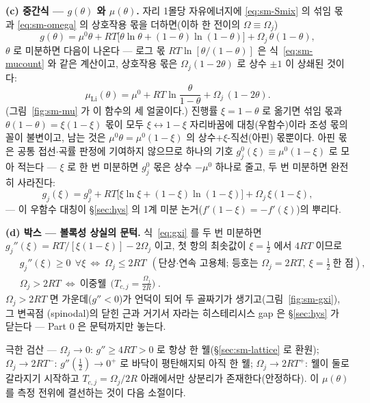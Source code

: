 \textbf{(c) 중간식 --- $g(\theta)$ 와 $\mu(\theta)$.} 자리 1몰당 자유에너지에 \eqref{eq:sm-Smix} 의 섞임 몫과
\eqref{eq:sm-omega} 의 상호작용 몫을 더하면(이하 한 전이의 $\Omega\equiv\Omega_j$)
\begin{equation}
g(\theta)=\mu^0\theta+RT\big[\theta\ln\theta+(1-\theta)\ln(1-\theta)\big]+\Omega_j\,\theta(1-\theta),
\label{eq:sm-gtheta}
\end{equation}
$\theta$ 로 미분하면 다음이 나온다 --- 로그 몫 $RT\ln[\theta/(1-\theta)]$ 은 식~\eqref{eq:sm-mucount} 와 같은 계산이고,
상호작용 몫은 $\Omega_j(1-2\theta)$ 로 상수 $\pm1$ 이 상쇄된 것이다:
\begin{equation}
\mu_\mathrm{Li}(\theta)=\mu^0+RT\ln\frac{\theta}{1-\theta}+\Omega_j\,(1-2\theta).
\label{eq:mu}
\end{equation}
(그림~\ref{fig:sm-mu} 가 이 함수의 세 얼굴이다.) 진행률 $\xi=1-\theta$ 로 옮기면 섞임 몫과
$\theta(1-\theta)=\xi(1-\xi)$ 몫이 모두 $\xi\leftrightarrow1-\xi$ 자리바꿈에 대칭(우함수)이라 조성 몫의 꼴이
불변이고, 남는 것은 $\mu^0\theta=\mu^0(1-\xi)$ 의 상수$+\xi$-직선(아핀) 몫뿐이다. 아핀 몫은 공통
접선$\cdot$곡률 판정에 기여하지 않으므로 하나의 기호 $g_j^0(\xi)\equiv\mu^0(1-\xi)$ 로 모아 적는다 ---
$\xi$ 로 한 번 미분하면 $g_j^0$ 몫은 상수 $-\mu^0$ 하나로 줄고, 두 번 미분하면 완전히 사라진다:
\begin{equation}
g_j(\xi)=g_j^0+RT\big[\xi\ln\xi+(1-\xi)\ln(1-\xi)\big]+\Omega_j\,\xi(1-\xi),
\label{eq:gxi}
\end{equation}
--- 이 우함수 대칭이 \S\ref{sec:hys} 의 1계 미분 논거($f'(1-\xi)=-f'(\xi)$)의 뿌리다.

\textbf{(d) 박스 --- 볼록성 상실의 문턱.} 식~\eqref{eq:gxi} 를 두 번 미분하면
$g_j''(\xi)=RT/[\xi(1-\xi)]-2\Omega_j$ 이고, 첫 항의 최솟값이 $\xi=\tfrac12$ 에서 $4RT$ 이므로
\begin{equation}
\boxed{\;
\begin{aligned}
&g_j''(\xi)\ge0\ \ \forall\xi\ \Longleftrightarrow\ \Omega_j\le2RT\ \ (\text{단상·연속 고용체; 등호는 }\Omega_j{=}2RT,\ \xi{=}\tfrac12\ \text{한 점}),\\
&\Omega_j>2RT\ \Longleftrightarrow\ \text{이중웰}\ \ \Big(T_{c,j}=\frac{\Omega_j}{2R}\Big)\;.
\end{aligned}}
\label{eq:sm-thresh}
\end{equation}
$\Omega_j>2RT$ 면 가운데($g''<0$)가 언덕이 되어 두 골짜기가 생기고(그림~\ref{fig:sm-gxi}), 그 변곡점
(spinodal)의 닫힌 근과 거기서 자라는 히스테리시스 gap 은 \S\ref{sec:hys} 가 닫는다 --- Part 0 은 문턱까지만
놓는다.
\begin{verifybox}
극한 검산 --- $\Omega_j\to0$: $g''\ge4RT>0$ 로 항상 한 웰(\S\ref{sec:sm-lattice} 로 환원);
$\Omega_j\to2RT^-$: $g''(\tfrac12)\to0^+$ 로 바닥이 평탄해지되 아직 한 웰; $\Omega_j\to2RT^+$: 웰이 둘로
갈라지기 시작하고 $T_{c,j}=\Omega_j/2R$ 아래에서만 상분리가 존재한다(안정하다). 이 $\mu(\theta)$ 를 측정 전위에 결선하는
것이 다음 소절이다.
\end{verifybox}

